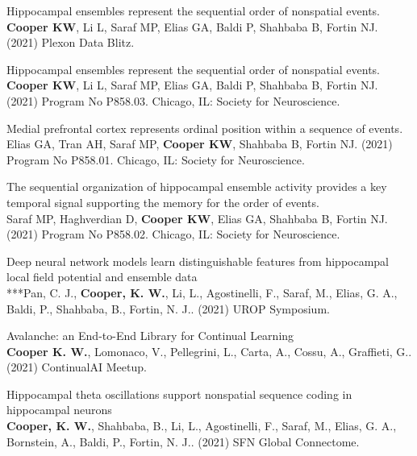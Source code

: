 \documentclass[10pt]{cooperCV2}
\begin{document}
 
\begin{etaremune}[itemindent=-1.5\bibhang, topsep=0pt,
				   itemsep=\bibsep,partopsep=0pt,parsep=0pt,leftmargin={\bibhang+\widthof{[999]}}] 
    
    \item Hippocampal ensembles represent the sequential order of nonspatial events.\\ \textbf{Cooper KW}, Li L, Saraf MP, Elias GA, Baldi P, Shahbaba B, Fortin NJ. (2021) Plexon Data Blitz. 
     
	
    \item Hippocampal ensembles represent the sequential order of nonspatial events.\\ \textbf{Cooper KW}, Li L, Saraf MP, Elias GA, Baldi P, Shahbaba B, Fortin NJ. (2021) Program No P858.03. Chicago, IL: Society for Neuroscience. 
     
	
    \item Medial prefrontal cortex represents ordinal position within a sequence of events.\\ Elias GA, Tran AH, Saraf MP, \textbf{Cooper KW}, Shahbaba B, Fortin NJ. (2021) Program No P858.01. Chicago, IL: Society for Neuroscience. 
     
	
    \item The sequential organization of hippocampal ensemble activity provides a key temporal signal supporting the memory for the order of events.\\ Saraf MP, Haghverdian D, \textbf{Cooper KW}, Elias GA, Shahbaba B, Fortin NJ. (2021) Program No P858.02. Chicago, IL: Society for Neuroscience. 
     
	
    \item Deep neural network models learn distinguishable features from hippocampal local field potential and ensemble data\\ ***Pan, C. J., \textbf{Cooper, K. W.}, Li, L., Agostinelli, F., Saraf, M., Elias, G. A., Baldi, P.,  Shahbaba, B., Fortin, N. J.. (2021) UROP Symposium. 
     
	
    \item Avalanche: an End-to-End Library for Continual Learning\\ \textbf{Cooper K. W.}, Lomonaco, V., Pellegrini, L., Carta, A., Cossu, A., Graffieti, G.. (2021) ContinualAI Meetup. 
     
	
    \item Hippocampal theta oscillations support nonspatial sequence coding in hippocampal neurons\\ \textbf{Cooper, K. W.}, Shahbaba, B., Li, L., Agostinelli, F., Saraf, M., Elias, G. A., Bornstein, A., Baldi, P.,  Fortin, N. J.. (2021) SFN Global Connectome. 
     

\end{etaremune}
\end{document}
